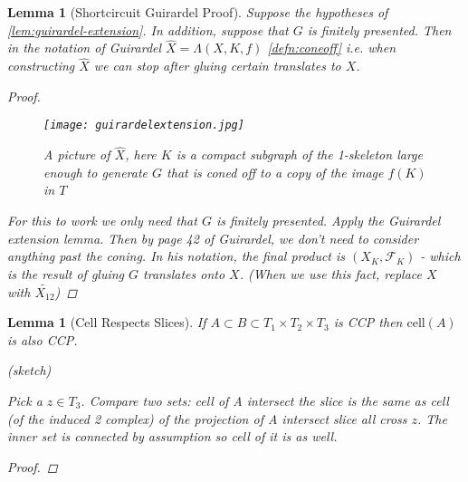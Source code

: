 \documentclass{article}
\theoremstyle{mystyle}
\newtheorem{lem}[thm]{Lemma}
\theoremstyle{remark}
\begin{document}
\begin{lem}
    [Shortcircuit Guirardel Proof]
    \label{lem:shortcircuit} Suppose the hypotheses of \ref{lem:guirardel-extension}. In addition, suppose that $G$ is finitely presented. Then in the notation of Guirardel $\widehat X = \Lambda(X,K,f)$ \ref{defn:coneoff} i.e. when constructing $\widehat X$ we can stop after gluing certain translates to $X$.
    \begin{proof}
        
        \begin{figure}[htp]
    \centering
    \texttt{[image: guirardelextension.jpg]}
    \caption{A picture of $\widehat X$, here $K$ is a compact subgraph of the 1-skeleton large enough to generate $G$ that is coned off to a copy of the image $f(K)$ in $T$}
    \label{fig:guirardelextension}
\end{figure}
        For this to work we only need that $G$ is finitely presented. Apply the Guirardel extension lemma. Then by page 42 of Guirardel, we don't need to consider anything past the coning. In his notation, the final product is $(X_K, \mathscr{F}_K)$ - which is the result of gluing $G$ translates onto $X$. (When we use this fact, replace $X$ with $\widetilde{X_{12}}$)
    \end{proof}
\end{lem}
\begin{lem}
    [Cell Respects Slices]
    If $A\subset B\subset T_1\times T_2\times T_3$ is CCP then $\text{cell}(A)$ is also CCP.
    \label{lem:cellrespecslice} 
    
    (sketch)
        
        Pick a $z \in T_3$. Compare two sets: cell of A intersect the slice is the same as cell (of the induced 2 complex) of the projection of A intersect slice all cross $z$. The inner set is connected by assumption so cell of it is as well.
    
    \begin{proof}
    
    \end{proof}
\end{lem}
\end{document}

